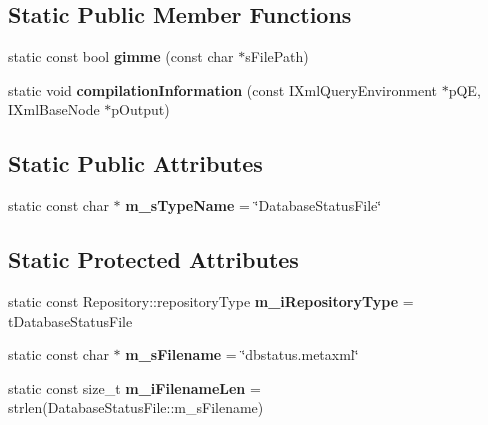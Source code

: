 \subsection*{\-Static \-Public \-Member \-Functions}
\begin{DoxyCompactItemize}
\item 
\hypertarget{classgeneral__server_1_1DatabaseStatusFile_ab30bb23fcbd3a1fccb272ddcd85ec922}{static const bool {\bfseries gimme} (const char $\ast$s\-File\-Path)}\label{classgeneral__server_1_1DatabaseStatusFile_ab30bb23fcbd3a1fccb272ddcd85ec922}

\item 
\hypertarget{classgeneral__server_1_1DatabaseStatusFile_a34cec79d3051898c3220315f41c5aba8}{static void {\bfseries compilation\-Information} (const \-I\-Xml\-Query\-Environment $\ast$p\-Q\-E, \-I\-Xml\-Base\-Node $\ast$p\-Output)}\label{classgeneral__server_1_1DatabaseStatusFile_a34cec79d3051898c3220315f41c5aba8}

\end{DoxyCompactItemize}
\subsection*{\-Static \-Public \-Attributes}
\begin{DoxyCompactItemize}
\item 
\hypertarget{classgeneral__server_1_1DatabaseStatusFile_a83c07b1f70a7775dccc9602bc3fa10d0}{static const char $\ast$ {\bfseries m\-\_\-s\-Type\-Name} = \char`\"{}\-Database\-Status\-File\char`\"{}}\label{classgeneral__server_1_1DatabaseStatusFile_a83c07b1f70a7775dccc9602bc3fa10d0}

\end{DoxyCompactItemize}
\subsection*{\-Static \-Protected \-Attributes}
\begin{DoxyCompactItemize}
\item 
\hypertarget{classgeneral__server_1_1DatabaseStatusFile_a034cc778a205df0e646d3bee011b9efb}{static const \*
\-Repository\-::repository\-Type {\bfseries m\-\_\-i\-Repository\-Type} = t\-Database\-Status\-File}\label{classgeneral__server_1_1DatabaseStatusFile_a034cc778a205df0e646d3bee011b9efb}

\item 
\hypertarget{classgeneral__server_1_1DatabaseStatusFile_ac47f1e8b44b86ac07ef937bc43557811}{static const char $\ast$ {\bfseries m\-\_\-s\-Filename} = \char`\"{}dbstatus.\-metaxml\char`\"{}}\label{classgeneral__server_1_1DatabaseStatusFile_ac47f1e8b44b86ac07ef937bc43557811}

\item 
\hypertarget{classgeneral__server_1_1DatabaseStatusFile_a425274731d1f104a8b318c6502fddc25}{static const size\-\_\-t {\bfseries m\-\_\-i\-Filename\-Len} = strlen(\-Database\-Status\-File\-::m\-\_\-s\-Filename)}\label{classgeneral__server_1_1DatabaseStatusFile_a425274731d1f104a8b318c6502fddc25}

\end{DoxyCompactItemize}
